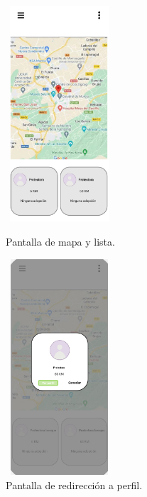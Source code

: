 \documentclass[a4paper, 12pt]{article}
\begin{document}
\begin{figure}[H]
   	\begin{minipage}{0.48\textwidth}
		\begin{center}
			{\includegraphics[height=8cm, width=4cm]{design/MapPage.jpg}\par}
			\caption{Pantalla de mapa y lista.}
			\medskip
		\end{center}  
	\end{minipage}\hfill
   	\begin{minipage}{0.48\textwidth}
		\begin{center}
			{\includegraphics[height=8cm, width=4cm]{design/MapAction.jpg}\par}
			\caption{Pantalla de redirección a perfil.}
			\medskip
		\end{center}  
	\end{minipage}\hfill
\end{figure}
\end{document}
